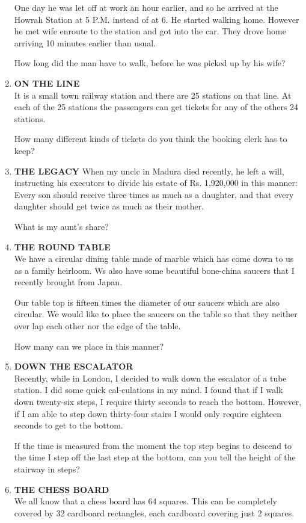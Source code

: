 \documentclass[12pt]{article}
\begin{document}
\begin{enumerate}
One day  he was  let off at work  an hour  earlier,  and so he arrived  at the Howrah  Station  at 5 P.M.  instead  of at 6. He  started  walking  home.  However  he met  wife enroute  to the  station  and  got into  the car. They drove  home  arriving  10 minutes  earlier  than  usual. 

How  long  did  the  man  have  to walk,  before  he was picked  up by his wife? 
%
\item \textbf{ON  THE  LINE} \\
It is a small  town  railway  station  and  there  are  25 stations  on that  line.  At  each  of the  25 stations  the passengers  can  get  tickets  for  any  of the  others  24 stations. 

How  many  different  kinds  of tickets  do you  think the booking  clerk  has to keep? 
%
\item \textbf{THE  LEGACY} 
When  my  unclc  in Madura  died  recently,  he left  a will, instructing  his executors  to divide  his estate  of Rs. 1,920,000  in this  manner:  Every  son should  receive  three times  as much  as a daughter,  and  that  every  daughter should  get twice  as much  as their  mother. 

What  is my aunt's  share? 
%
\item \textbf{THE  ROUND  TABLE} \\
We have  a circular  dining  table  made  of marble which  has  come  down  to us as a family  heirloom.  Ws also have  some  beautiful  bone-china  saucers  that  I recently  brought  from  Japan. 

Our table  top  is fifteen  times  the  diameter  of our saucers  which  are also  circular.  We  would  like to place the saucers  on the table  so that  they  neither  over  lap each other  nor the edge  of the table. 

How  many  can we place  in this manner?
%
\item \textbf{DOWN  THE  ESCALATOR} \\
Recently,  while  in London,  I decided  to walk  down the escalator  of a tube  station.  I did some  quick  cal-culations  in my  mind.  I found  that  if I walk  down twenty-six  steps,  I require  thirty  seconds  to reach  the bottom.  However,  if I am able  to step  down  thirty-four stairs  I would  only  require  eighteen  seconds  to get to the bottom. 

If the  time  is measured  from  the  moment  the top step begins  to descend  to the time  I step  off the last  step at the bottom,  can  you  tell  the  height  of the stairway in steps? 
%
\item \textbf{THE  CHESS  BOARD} \\
We all know  that  a chess  board  has  64 squares.  This can be completely  covered  by 32 cardboard  rectangles, each cardboard  covering  just 2 squares.


\end{enumerate}
\end{document}
